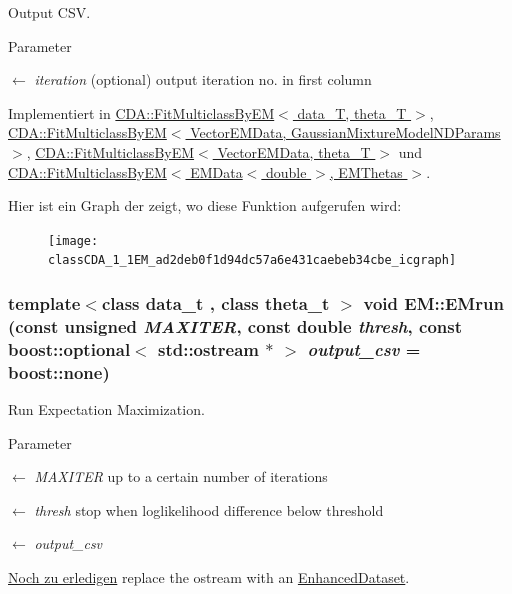 Output CSV. 


\begin{DoxyParams}{Parameter}
\item[\mbox{$\leftarrow$} {\em iteration}](optional) output iteration no. in first column \end{DoxyParams}


Implementiert in \hyperlink{classCDA_1_1FitMulticlassByEM_abd04a7135250a427a100c95bf2bf43a9}{CDA::FitMulticlassByEM$<$ data\_\-T, theta\_\-T $>$}, \hyperlink{classCDA_1_1FitMulticlassByEM_abd04a7135250a427a100c95bf2bf43a9}{CDA::FitMulticlassByEM$<$ VectorEMData, GaussianMixtureModelNDParams $>$}, \hyperlink{classCDA_1_1FitMulticlassByEM_abd04a7135250a427a100c95bf2bf43a9}{CDA::FitMulticlassByEM$<$ VectorEMData, theta\_\-T $>$} und \hyperlink{classCDA_1_1FitMulticlassByEM_abd04a7135250a427a100c95bf2bf43a9}{CDA::FitMulticlassByEM$<$ EMData$<$ double $>$, EMThetas $>$}.



Hier ist ein Graph der zeigt, wo diese Funktion aufgerufen wird:\nopagebreak
\begin{figure}[H]
\begin{center}
\leavevmode
\texttt{[image: classCDA\_1\_1EM\_ad2deb0f1d94dc57a6e431caebeb34cbe\_icgraph]}
\end{center}
\end{figure}


\hypertarget{classCDA_1_1EM_a1c8fa9008da1f168f211f48c578dce5f}{
\subsubsection[{EMrun}]{\setlength{\rightskip}{0pt plus 5cm}template$<$class data\_\-t , class theta\_\-t $>$ void EM::EMrun (const unsigned {\em MAXITER}, \/  const double {\em thresh}, \/  const boost::optional$<$ std::ostream $\ast$ $>$ {\em output\_\-csv} = {\ttfamily boost::none})}}
\label{classCDA_1_1EM_a1c8fa9008da1f168f211f48c578dce5f}


Run Expectation Maximization. 


\begin{DoxyParams}{Parameter}
\item[\mbox{$\leftarrow$} {\em MAXITER}]up to a certain number of iterations \item[\mbox{$\leftarrow$} {\em thresh}]stop when loglikelihood difference below threshold \item[\mbox{$\leftarrow$} {\em output\_\-csv}]\end{DoxyParams}
\begin{Desc}
\item[\hyperlink{todo__todo000002}{Noch zu erledigen}]replace the ostream with an \hyperlink{classCDA_1_1EnhancedDataset}{EnhancedDataset}. \end{Desc}


